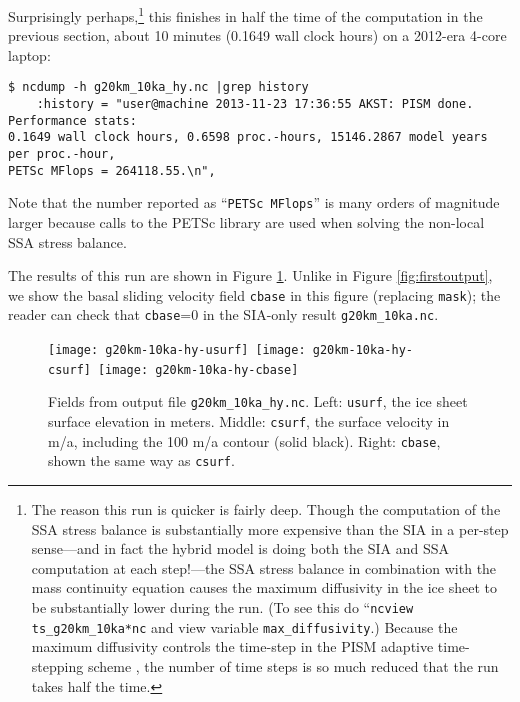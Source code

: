 Surprisingly perhaps,\footnote{The reason this run is quicker is fairly deep.  Though the computation of the SSA stress balance is substantially more expensive than the SIA in a per-step sense---and in fact the hybrid model is doing both the SIA and SSA computation at each step!---the SSA stress balance in combination with the mass continuity equation causes the maximum diffusivity in the ice sheet to be substantially lower during the run.  (To see this do ``\texttt{ncview ts_g20km_10ka*nc} and view variable \texttt{max_diffusivity}.)  Because the maximum diffusivity controls the time-step in the PISM adaptive time-stepping scheme \cite{BBL}, the number of time steps is so much reduced that the run takes half the time.} this finishes in half the time of the computation in the previous section, about 10 minutes (0.1649 wall clock hours) on a 2012-era 4-core laptop:
\begin{verbatim}
$ ncdump -h g20km_10ka_hy.nc |grep history
    :history = "user@machine 2013-11-23 17:36:55 AKST: PISM done.  Performance stats:
0.1649 wall clock hours, 0.6598 proc.-hours, 15146.2867 model years per proc.-hour,
PETSc MFlops = 264118.55.\n",
\end{verbatim}
Note that the number reported as ``\texttt{PETSc MFlops}'' is many orders of magnitude larger because calls to the PETSc library are used when solving the non-local SSA stress balance.

The results of this run are shown in Figure \ref{fig:secondoutputcoarse}.  Unlike in Figure \ref{fig:firstoutput}, we show the basal sliding velocity field \texttt{cbase} in this figure (replacing \texttt{mask}); the reader can check that \texttt{cbase}=0 in the SIA-only result \texttt{g20km_10ka.nc}.

\begin{figure}[ht]
\centering
\mbox{\texttt{[image: g20km-10ka-hy-usurf]} \texttt{[image: g20km-10ka-hy-csurf]} \texttt{[image: g20km-10ka-hy-cbase]}}
\caption{Fields from output file \texttt{g20km_10ka_hy.nc}.  Left: \texttt{usurf}, the ice sheet surface elevation in meters.  Middle: \texttt{csurf}, the surface velocity in m/a, including the 100 m/a contour (solid black).  Right: \texttt{cbase}, shown the same way as \texttt{csurf}.}
\label{fig:secondoutputcoarse}
\end{figure}

